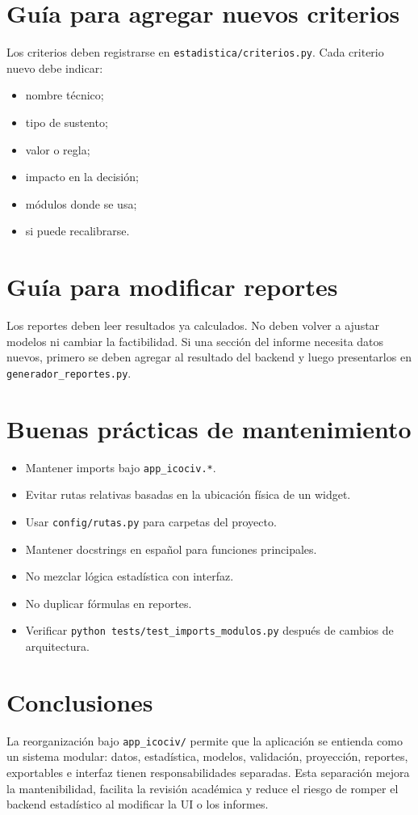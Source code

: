 \documentclass[12pt,letterpaper]{article}
\begin{document}
\section{Guía para agregar nuevos criterios}

Los criterios deben registrarse en \texttt{estadistica/criterios.py}. Cada criterio nuevo debe indicar:

\begin{itemize}[leftmargin=*]
    \item nombre técnico;
    \item tipo de sustento;
    \item valor o regla;
    \item impacto en la decisión;
    \item módulos donde se usa;
    \item si puede recalibrarse.
\end{itemize}

\section{Guía para modificar reportes}

Los reportes deben leer resultados ya calculados. No deben volver a ajustar modelos ni cambiar la factibilidad. Si una sección del informe necesita datos nuevos, primero se deben agregar al resultado del backend y luego presentarlos en \texttt{generador\_reportes.py}.

\section{Buenas prácticas de mantenimiento}

\begin{itemize}[leftmargin=*]
    \item Mantener imports bajo \texttt{app\_icociv.*}.
    \item Evitar rutas relativas basadas en la ubicación física de un widget.
    \item Usar \texttt{config/rutas.py} para carpetas del proyecto.
    \item Mantener docstrings en español para funciones principales.
    \item No mezclar lógica estadística con interfaz.
    \item No duplicar fórmulas en reportes.
    \item Verificar \texttt{python tests/test\_imports\_modulos.py} después de cambios de arquitectura.
\end{itemize}

\section{Conclusiones}

La reorganización bajo \texttt{app\_icociv/} permite que la aplicación se entienda como un sistema modular: datos, estadística, modelos, validación, proyección, reportes, exportables e interfaz tienen responsabilidades separadas. Esta separación mejora la mantenibilidad, facilita la revisión académica y reduce el riesgo de romper el backend estadístico al modificar la UI o los informes.
\end{document}
